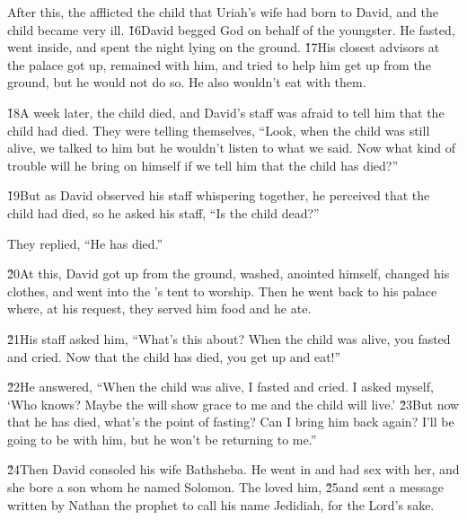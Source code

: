 After this, the  afflicted the child that Uriah's wife had born to David, and the child became very ill. \v{16}David begged God on behalf of the youngster. He fasted, went inside, and spent the night lying on the ground. \v{17}His closest advisors at the palace got up, remained with him, and tried to help him get up from the ground, but he would not do so. He also wouldn't eat with them.

\v{18}A week later, the child died, and David's staff was afraid to tell him that the child had died. They were telling themselves, ``Look, when the child was still alive, we talked to him but he wouldn't listen to what we said. Now what kind of trouble will he bring on himself if we tell him that the child has died?''

\v{19}But as David observed his staff whispering together, he perceived that the child had died, so he asked his staff, ``Is the child dead?''

They replied, ``He has died.''

\v{20}At this, David got up from the ground, washed, anointed himself, changed his clothes, and went into the 's tent to worship. Then he went back to his palace where, at his request, they served him food and he ate.

\v{21}His staff asked him, ``What's this about? When the child was alive, you fasted and cried. Now that the child has died, you get up and eat!''

\v{22}He answered, ``When the child was alive, I fasted and cried. I asked myself, `Who knows? Maybe the  will show grace to me and the child will live.' \v{23}But now that he has died, what's the point of fasting? Can I bring him back again? I'll be going to be with him, but he won't be returning to me.''

\v{24}Then David consoled his wife Bathsheba. He went in and had sex with her, and she bore a son whom he named Solomon. The  loved him, \v{25}and sent a message written by Nathan the prophet to call his name Jedidiah, for the Lord's sake.

